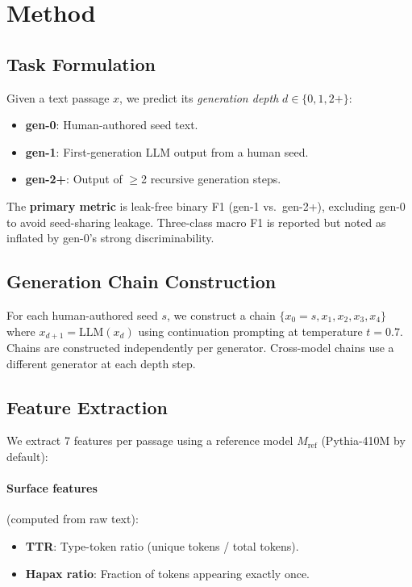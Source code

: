\documentclass[11pt,twocolumn]{article}
\begin{document}
\section{Method}

\subsection{Task Formulation}

Given a text passage $x$, we predict its \emph{generation depth} $d \in \{0, 1, 2+\}$:
\begin{itemize}[nosep,leftmargin=*]
    \item \textbf{gen-0}: Human-authored seed text.
    \item \textbf{gen-1}: First-generation LLM output from a human seed.
    \item \textbf{gen-2+}: Output of $\geq$2 recursive generation steps.
\end{itemize}

The \textbf{primary metric} is leak-free binary F1 (gen-1 vs.\ gen-2+), excluding gen-0 to avoid seed-sharing leakage.
Three-class macro F1 is reported but noted as inflated by gen-0's strong discriminability.

\subsection{Generation Chain Construction}

For each human-authored seed $s$, we construct a chain $\{x_0 = s, x_1, x_2, x_3, x_4\}$ where $x_{d+1} = \text{LLM}(x_d)$ using continuation prompting at temperature $t = 0.7$.
Chains are constructed independently per generator.
Cross-model chains use a different generator at each depth step.

\subsection{Feature Extraction}
\label{sec:features}

We extract 7 features per passage using a reference model $M_{\text{ref}}$ (Pythia-410M by default):

\paragraph{Surface features} (computed from raw text):
\begin{itemize}[nosep,leftmargin=*]
    \item \textbf{TTR}: Type-token ratio (unique tokens / total tokens).
    \item \textbf{Hapax ratio}: Fraction of tokens appearing exactly once.
\end{itemize}
\end{document}
